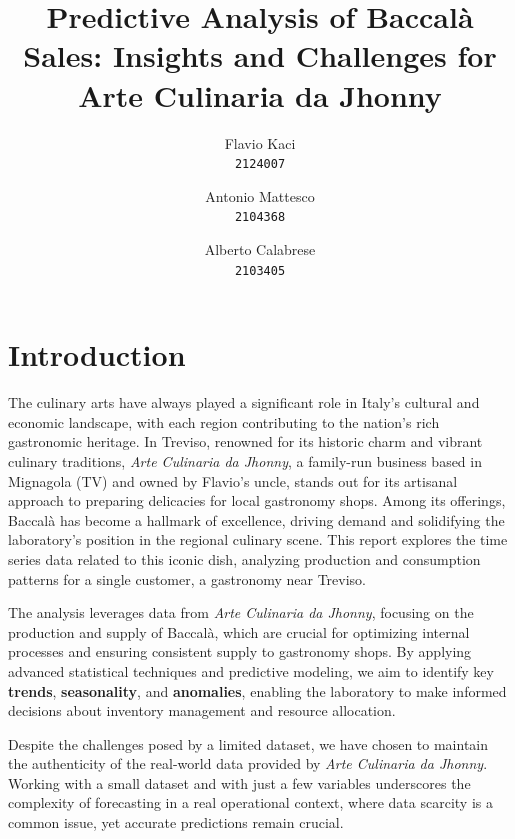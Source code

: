 \documentclass[10pt,twocolumn,letterpaper]{article}
\begin{document}
\title{Predictive Analysis of Baccalà Sales: Insights and Challenges for Arte Culinaria da Jhonny}

\author{
Flavio Kaci\\
{\tt\small 2124007}
\and
Antonio Mattesco\\
{\tt\small 2104368}
\and 
Alberto Calabrese\\
{\tt\small 2103405}
}

\date{}
\maketitle


\section{Introduction}

The culinary arts have always played a significant role in Italy’s cultural and economic landscape, with each region contributing to the nation’s rich gastronomic heritage. In Treviso, renowned for its historic charm and vibrant culinary traditions, \textit{Arte Culinaria da Jhonny}, a family-run business based in Mignagola (TV) and owned by Flavio’s uncle, stands out for its artisanal approach to preparing delicacies for local gastronomy shops. Among its offerings, Baccalà has become a hallmark of excellence, driving demand and solidifying the laboratory’s position in the regional culinary scene. This report explores the time series data related to this iconic dish, analyzing production and consumption patterns for a single customer, a gastronomy near Treviso.

The analysis leverages data from \textit{Arte Culinaria da Jhonny}, focusing on the production and supply of Baccalà, which are crucial for optimizing internal processes and ensuring consistent supply to gastronomy shops. By applying advanced statistical techniques and predictive modeling, we aim to identify key \textbf{trends}, \textbf{seasonality}, and \textbf{anomalies}, enabling the laboratory to make informed decisions about inventory management and resource allocation.

Despite the challenges posed by a limited dataset, we have chosen to maintain the authenticity of the real-world data provided by \textit{Arte Culinaria da Jhonny}. Working with a small dataset and with just a few variables underscores the complexity of forecasting in a real operational context, where data scarcity is a common issue, yet accurate predictions remain crucial.
\end{document}
